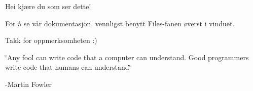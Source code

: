 Hei kjære du som ser dette!

For å se vår dokumentasjon, vennligst benytt Files-\/fanen øverst i vinduet.

Takk for oppmerksomheten \+:) 

 \char`\"{}\+Any fool can write code that a computer can understand.
\+Good programmers write code that humans can understand\char`\"{}

-\/\+Martin Fowler 